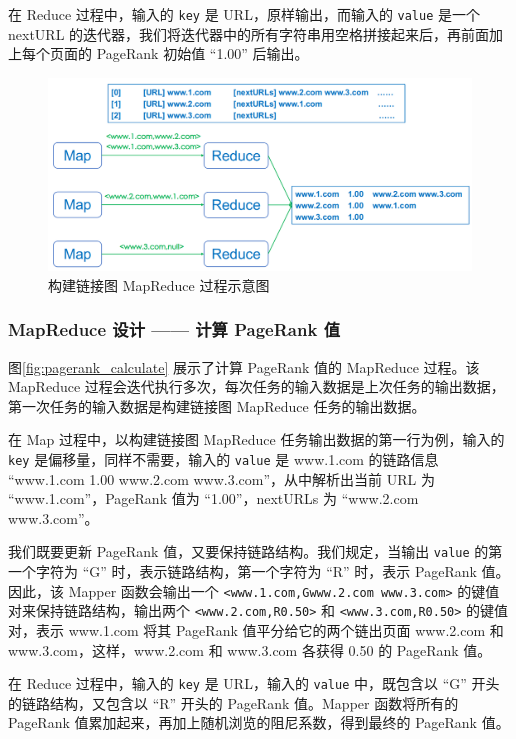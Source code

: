 \documentclass{ctexart}
\newcommand{\code}[1]{\colorbox{backcolor}{\lstinline|#1|}}
\begin{document}
    在 Reduce 过程中，输入的 \code{key} 是 URL，原样输出，而输入的 \code{value} 是一个 nextURL 的迭代器，我们将迭代器中的所有字符串用空格拼接起来后，再前面加上每个页面的 PageRank 初始值 “1.00” 后输出。

    \begin{figure}[t]
        \centering
        \includegraphics[width=\textwidth]{src/pagerank_build-graph}
        \caption{构建链接图 MapReduce 过程示意图}
        \label{fig:pagerank_build-graph}
    \end{figure}

    \subsubsection{MapReduce 设计 —— 计算 PageRank 值}\label{subsubsec:pagerank_calc}

    图\ref{fig:pagerank_calculate} 展示了计算 PageRank 值的 MapReduce 过程。该 MapReduce 过程会迭代执行多次，每次任务的输入数据是上次任务的输出数据，第一次任务的输入数据是构建链接图 MapReduce 任务的输出数据。

    在 Map 过程中，以构建链接图 MapReduce 任务输出数据的第一行为例，输入的 \code{key} 是偏移量，同样不需要，输入的 \code{value} 是 www.1.com 的链路信息 “www.1.com 1.00 www.2.com www.3.com”，从中解析出当前 URL 为 “www.1.com”，PageRank 值为 “1.00”，nextURLs 为 “www.2.com www.3.com”。

    我们既要更新 PageRank 值，又要保持链路结构。我们规定，当输出 \code{value} 的第一个字符为 “G” 时，表示链路结构，第一个字符为 “R” 时，表示 PageRank 值。因此，该 Mapper 函数会输出一个 \code{<www.1.com,Gwww.2.com www.3.com>} 的键值对来保持链路结构，输出两个 \code{<www.2.com,R0.50>} 和 \code{<www.3.com,R0.50>} 的键值对，表示 www.1.com 将其 PageRank 值平分给它的两个链出页面 www.2.com 和 www.3.com，这样，www.2.com 和 www.3.com 各获得 0.50 的 PageRank 值。

    在 Reduce 过程中，输入的 \code{key} 是 URL，输入的 \code{value} 中，既包含以 “G” 开头的链路结构，又包含以 “R” 开头的 PageRank 值。Mapper 函数将所有的 PageRank 值累加起来，再加上随机浏览的阻尼系数，得到最终的 PageRank 值\cite{wikipedia-pagerank}。
\end{document}
